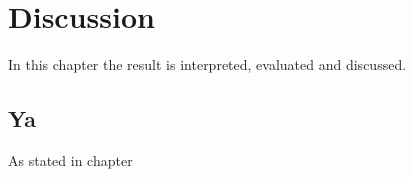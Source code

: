 \chapter{Discussion}


In this chapter the result is interpreted, evaluated and discussed.


\section{Ya}
As stated in chapter  


